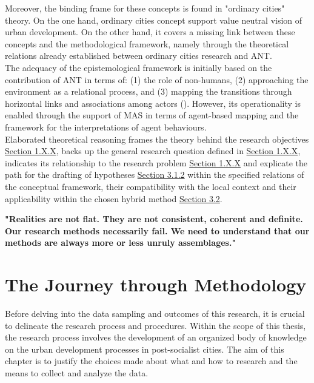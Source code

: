 \documentclass[11pt]{report}
\begin{document}
Moreover, the binding frame for these concepts is found in "ordinary cities" theory. On the one hand, ordinary cities concept support value neutral vision of urban development. On the other hand, it covers a missing link between these concepts and the methodological framework, namely through the theoretical relations already established between ordinary cities research and ANT.
\\

The adequacy of the epistemological framework is initially based on the contribution of ANT in terms of:
(1) the role of non-humans,
(2) approaching the environment as a relational process, and
(3) mapping the transitions through horizontal links and associations among actors (\cite{Latour 2005}).
However, its operationality is enabled through the support of MAS in terms of agent-based mapping and the framework for the interpretations of agent behaviours. 
\\

Elaborated theoretical reasoning frames the theory behind the research objectives \href{Section 1.X.X}{Section 1.X.X}, backs up the general research question defined in \href{Section 1.X.X}{Section 1.X.X}, indicates its relationship to the research problem \href{Section 1.X.X}{Section 1.X.X} and explicate the path for the drafting of hypotheses \href{Section 3.1.2}{Section 3.1.2} within the specified relations of the conceptual framework, their compatibility with the local context and their applicability within the chosen hybrid method \href{Section 3.2}{Section 3.2}.

\textbf{"Realities are not flat. They are not consistent, coherent and definite. Our research methods necessarily fail. We need to understand that our methods are always more or less unruly assemblages." \citealt{Law 2007}}



\chapter{The Journey through Methodology}

Before delving into the data sampling and outcomes of this research, it is crucial to delineate the research process and procedures. Within the scope of this thesis, the research process involves the development of an organized body of knowledge on the urban development processes in post-socialist cities. The aim of this chapter is to justify the choices made about what and how to research and the means to collect and analyze the data.
\\
\end{document}
